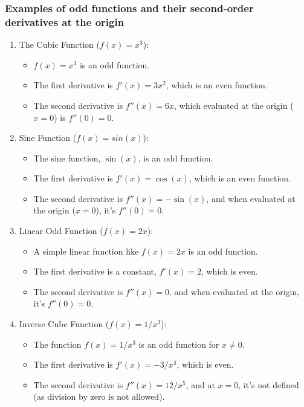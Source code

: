 \subsubsection{Examples of odd functions and their second-order derivatives at the origin}
\begin{enumerate}
    \item The Cubic Function ($f(x) = x^3$):
        \begin{itemize}
            \item $f(x) = x^3$ is an odd function.
            \item The first derivative is $f'(x) = 3x^2$, which is an even function.
            \item The second derivative is $f''(x) = 6x$, which evaluated at the origin ($x = 0$) is $f''(0) = 0$.
        \end{itemize}
    \item Sine Function ($f(x) = sin(x)$):
        \begin{itemize}
            \item The sine function, $\sin(x)$, is an odd function.
            \item The first derivative is $f'(x) = \cos(x)$, which is an even function.
            \item The second derivative is $f''(x) = -\sin(x)$, and when evaluated at the origin ($x = 0$), it's $f''(0) = 0$.
        \end{itemize}
    \item Linear Odd Function ($f(x) = 2x$):
        \begin{itemize}
            \item A simple linear function like $f(x) = 2x$ is an odd function.
            \item The first derivative is a constant, $f'(x) = 2$, which is even.
            \item The second derivative is $f''(x) = 0$, and when evaluated at the origin, it's $f''(0) = 0$.
        \end{itemize}
    \item Inverse Cube Function ($f(x) = 1/x^3$):
        \begin{itemize}
            \item The function $f(x) = 1/x^3$ is an odd function for $x \neq 0$.
            \item The first derivative is $f'(x) = -3/x^4$, which is even.
            \item The second derivative is $f''(x) = 12/x^5$, and at $x = 0$, it's not defined (as division by zero is not allowed).
        \end{itemize}
\end{enumerate}

